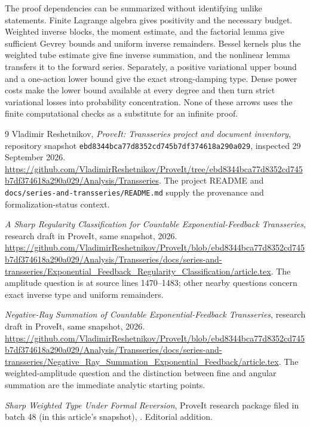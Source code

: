 \documentclass[11pt,a4paper]{article}
\numberwithin{equation}{section}
\theoremstyle{definition}
\theoremstyle{remark}
\theoremstyle{definition}
\begin{document}
The proof dependencies can be summarized without identifying unlike
statements. Finite Lagrange algebra gives positivity and the necessary
budget. Weighted inverse blocks, the moment estimate, and the factorial
lemma give sufficient Gevrey bounds and uniform inverse remainders.
Bessel kernels plus the weighted tube estimate give fine inverse
summation, and the nonlinear lemma transfers it to the forward series.
Separately, a positive variational upper bound and a one-action lower
bound give the exact strong-damping type. Dense power costs make the
lower bound available at every degree and then turn strict variational
losses into probability concentration. None of these arrows uses the
finite computational checks as a substitute for an infinite proof.

\clearpage
\begin{thebibliography}{9}
Vladimir Reshetnikov, \emph{ProveIt: Transseries project and document
inventory}, repository snapshot
\texttt{ebd8344bca77d8352cd745b7df374618a290a029}, inspected 29 September 2026.
\url{https://github.com/VladimirReshetnikov/ProveIt/tree/ebd8344bca77d8352cd745b7df374618a290a029/Analysis/Transseries}.
The project README and
\texttt{docs/series-and-transseries/README.md} supply the provenance and
formalization-status context.

\emph{A Sharp Regularity Classification for Countable Exponential-Feedback
Transseries}, research draft in ProveIt, same snapshot, 2026.
\url{https://github.com/VladimirReshetnikov/ProveIt/blob/ebd8344bca77d8352cd745b7df374618a290a029/Analysis/Transseries/docs/series-and-transseries/Exponential_Feedback_Regularity_Classification/article.tex}.
The amplitude question is at source lines 1470--1483; other nearby
questions concern exact inverse type and uniform remainders.

\emph{Negative-Ray Summation of Countable Exponential-Feedback Transseries},
research draft in ProveIt, same snapshot, 2026.
\url{https://github.com/VladimirReshetnikov/ProveIt/blob/ebd8344bca77d8352cd745b7df374618a290a029/Analysis/Transseries/docs/series-and-transseries/Negative_Ray_Summation_Exponential_Feedback/article.tex}.
The weighted-amplitude question and the distinction between fine and
angular summation are the immediate analytic starting points.

\emph{Sharp Weighted Type Under Formal Reversion}, ProveIt research package
filed in batch 48 (in this article's snapshot),
.
Editorial addition.


\end{thebibliography}
\end{document}
